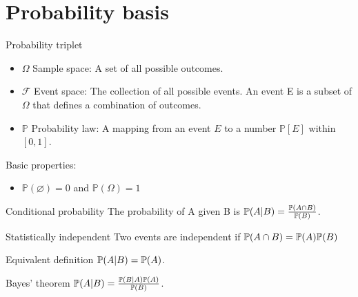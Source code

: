 \section{Probability basis}

\begin{fact}{Probability triplet}{}
  \begin{itemize}
    \item $\Omega$ \g Sample space: A set of all possible outcomes.
    \item $\mathcal{F}$ \g Event space: The collection of all  possible events. An event E is a subset of $\Omega$ that defines a combination of outcomes.
    \item $\mathbb{P}$ \g Probability law: A mapping from an event $E$ to a number $\mathbb{P}[E]$ within $[0,1]$.
  \end{itemize}
  Basic properties:
  \begin{itemize}
    \item $\mathbb{P}(\varnothing)=0$ and $\mathbb{P}(\Omega)=1$
  \end{itemize}
\end{fact}

\begin{fact}{Conditional probability}{}
  The probability of A given B is $\mathbb{P}(A|B) = \frac{\mathbb{P}(A\cap B)}{\mathbb{P}(B)}$.
\end{fact}

\begin{fact}{Statistically independent}{}
  Two events are independent if $\mathbb{P}(A\cap B) = \mathbb{P}(A)\mathbb{P}(B)$
\end{fact}

Equivalent definition \g $\mathbb{P}(A|B) = \mathbb{P}(A)$.

\begin{fact}{Bayes’ theorem}{}
  $\mathbb{P}(A|B) = \frac{\mathbb{P} (B|A)\mathbb{P}(A)}{\mathbb{P}(B)}$.
\end{fact}